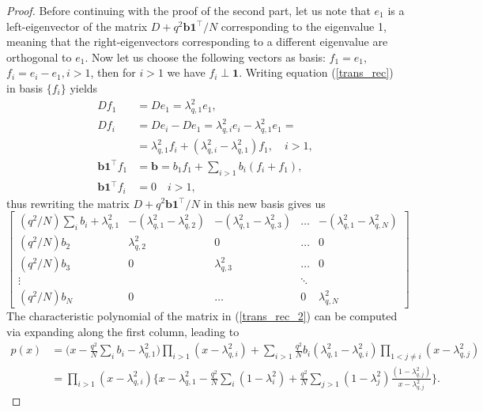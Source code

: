 \documentclass[a4paper,12pt]{article}
\begin{document}
\begin{proof}
	Before continuing with the proof of the second part, let us note that $e_1$ is a left-eigenvector of the matrix $D + q^2 \mathbf b \mathbf 1^\top/N$ corresponding to the eigenvalue 1, meaning that the right-eigenvectors corresponding to a different eigenvalue are orthogonal to $e_1$.  Now let us choose the following vectors as basis: $f_1 = e_1$, $f_i = e_i-e_1, i>1$, then for $i>1$ we have $f_i \perp \mathbf 1$. 
	Writing equation (\ref{trans_rec}) in basis $\{f_i\}$ yields 
	\begin{align*}
		Df_1 &= De_1 = \lambda_{q,1}^2 e_1, \\
		Df_i & = De_i - De_1 = \lambda_{q,i}^2e_i - \lambda_{q,1}^2 e_1 = \\
		& = \lambda_{q,1}^2 f_i +(\lambda_{q,i}^2-\lambda_{q,1}^2)f_1, \quad i>1, \\
		\mathbf b \mathbf 1^\top f_1 &= \mathbf b = b_1 f_1 + \sum_{i>1} b_i(f_i + f_1),  \\
		\mathbf b \mathbf 1^\top f_i&= 0 \quad i>1, 
	\end{align*}
	thus rewriting the matrix $D+q^2 \mathbf b \mathbf 1^\top /N$ in this new basis gives us
	\begin{equation} \label{trans_rec_2} 
		\begin{bmatrix}
			(q^2/N)\sum_i b_i + \lambda_{q,1}^2 & -(\lambda_{q,1}^2-\lambda_{q,2}^2) & -(\lambda_{q,1}^2 -\lambda_{q,3}^2) &\ldots  &  -(\lambda_{q,1}^2 - \lambda_{q,N}^2) \\ 
			(q^2/N) b_2 & \lambda_{q,2}^2 & 0 & \ldots & 0 \\
			(q^2/N) b_3 & 0 & \lambda_{q,3}^2 & \ldots & 0 \\
			\vdots & & & \ddots & \\ 
			(q^2/N)b_N &  0 & \ldots &  0 & \lambda_{q,N}^2 
		\end{bmatrix} 
	\end{equation}
	The characteristic polynomial of the matrix in (\ref{trans_rec_2}) can be computed via expanding along the first column, leading to
	\begin{align*}
		p(x) &= \bigg(x-\frac{q^2}N\sum_i b_i - \lambda_{q,1}^2\bigg)\prod_{i>1}(x-\lambda_{q,i}^2) + \sum_{i>1}\frac{q^2}N b_i(\lambda_{q,1}^2- \lambda_{q,i}^2) \prod_{1<j\neq i}(x-\lambda_{q,j}^2) \\
		& = \prod_{i>1} (x-\lambda_{q,i}^2) \bigg\{x - \lambda_{q,1}^2-\frac{q^2}N\sum_i (1-\lambda_{i}^2)   + \frac{q^2}N \sum_{j>1}(1-\lambda_j^2)\frac{(1 - \lambda_{q,j}^2)}{x-\lambda_{q,j}^2} \bigg\} .
	\end{align*}

\end{proof}
\end{document}
